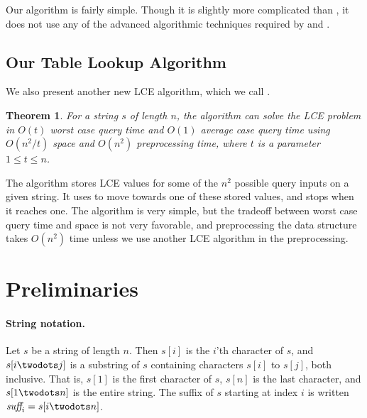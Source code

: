 \documentclass[a4]{article}
\newtheorem{theorem}{Theorem}
\begin{document}
Our algorithm is fairly simple. Though it is slightly more complicated than , it does not use any of the advanced algorithmic techniques required by  and .

\ifreport

\subsection{Our Table Lookup Algorithm}

We also present another new LCE algorithm, which we call .

\begin{theorem}
For a string $s$ of length $n$, the  algorithm can solve the LCE problem in $O(t)$ worst case query time and $O(1)$ average case query time using $O(n^2/t)$ space and $O(n^2)$ preprocessing time, where $t$ is a parameter $1 \leq t \leq n$.
\end{theorem}

The algorithm stores LCE values for some of the $n^2$ possible query inputs on a given string. It uses  to move towards one of these stored values, and stops when it reaches one. The  algorithm is very simple, but the tradeoff between worst case query time and space is not very favorable, and preprocessing the data structure takes $O(n^2)$ time unless we use another LCE algorithm in the preprocessing.

\fi %

\section{Preliminaries}

\paragraph{String notation.} Let $s$ be a string of length $n$. Then $s[i]$ is the $i$'th character of $s$, and $s[i\twodots j]$ is a substring of $s$ containing characters $s[i]$ to $s[j]$, both inclusive. That is, $s[1]$ is the first character of $s$, $s[n]$ is the last character, and $s[1\twodots n]$ is the entire string. The suffix of $s$ starting at index $i$ is written $\suff_i = s[i\twodots n]$.
\end{document}
